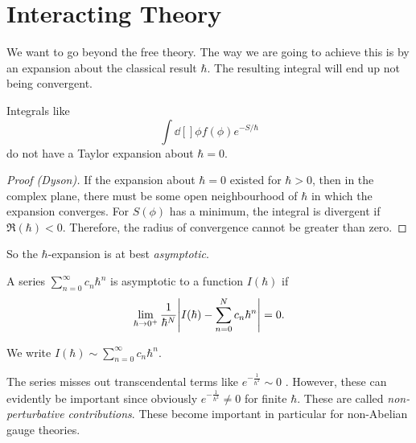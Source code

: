 
\section{Interacting Theory}%
\label{sec:interacting_theory}

We want to go beyond the free theory.
The way we are going to achieve this is by an expansion about the classical result $\hbar$.
The resulting integral will end up not being convergent.

\begin{claim}
  Integrals like
  \begin{equation}
    \int \dd[]{\phi} f(\phi) e^{- S / \hbar}
  \end{equation}
  do not have a Taylor expansion about $\hbar = 0$.
\end{claim}
\begin{proof}[Proof (Dyson)]
  If the expansion about $\hbar = 0$ existed for $\hbar > 0$, then in the complex plane, there must be some open neighbourhood of $\hbar$ in which the expansion converges.
  For $S(\phi)$ has a minimum, the integral is divergent if $\Re (\hbar)< 0$.
  Therefore, the radius of convergence cannot be greater than zero.
\end{proof}

So the $\hbar$-expansion is at best \emph{asymptotic}.
\begin{definition}[asymptotic]
  A series $\sum_{n = 0}^{\infty} c_n \hbar^n$  is asymptotic to a function $I(\hbar)$ if
  \begin{equation}
    \lim_{\hbar \to 0^+} \frac{1}{\hbar^N} \abs{I(\hbar) - \sum_{n=0}^N c_n \hbar^n} = 0.
  \end{equation} 
\end{definition}
\begin{notation}[]
  We write $I(\hbar) \sim \sum_{n=0}^{\infty} c_n \hbar^n$.
\end{notation}

The series misses out transcendental terms like $e^{-\frac{1}{\hbar^2}} \sim 0$ . However, these can evidently be important since obviously $e^{-\frac{1}{\hbar^2}} \neq 0$  for finite $\hbar$. These are called  \emph{non-perturbative contributions}. These become important in particular for non-Abelian gauge theories.

